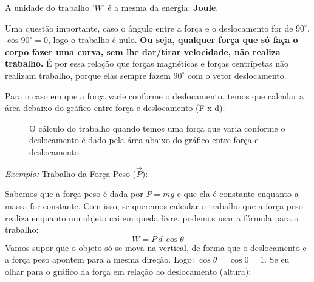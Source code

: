 \documentclass[12pt]{extarticle}
\newcommand{\<}{\langle}
\renewcommand{\>}{\rangle}
\theoremstyle{definition}
\begin{document}
A unidade do trabalho '$W$' é a mesma da energia: \textbf{Joule}.

Uma questão importante, caso o ângulo entre a força e o deslocamento for de $90^\circ$, $\cos90^\circ =0$, logo o trabalho é nulo. \textbf{Ou seja, qualquer força que só faça o corpo fazer uma curva, sem lhe dar/tirar velocidade, não realiza trabalho.} É por essa relação que forças magnéticas e forças centrípetas não realizam trabalho, porque elas sempre fazem $90^\circ$ com o vetor deslocamento.

Para o caso em que a força varie conforme o deslocamento, temos que calcular a área debaixo do gráfico entre força e deslocamento (F x d):
\begin{figure}[H]
    \centering
    \caption{O cálculo do trabalho quando temos uma força que varia conforme o deslocamento é dado pela área abaixo do gráfico entre força e deslocamento}
    \label{fig:trabalho}
\end{figure}

\textit{Exemplo:} Trabalho da Força Peso ($\vec{P}$):

Sabemos que a força peso é dada por $P=mg$ e que ela é constante enquanto a massa for constante. Com isso, se queremos calcular o trabalho que a força peso realiza enquanto um objeto cai em queda livre, podemos usar a fórmula para o trabalho:
\begin{equation}
    W = P\,d\,\cos\theta
\end{equation}
Vamos supor que o objeto só se mova na vertical, de forma que o deslocamento e a força peso apontem para a mesma direção. Logo: $\cos\theta = \cos0 = 1$. Se eu olhar para o gráfico da força em relação ao deslocamento (altura):
\end{document}
